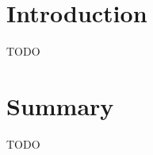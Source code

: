 \label{chap:dsl_implementation}

\section{Introduction}
\label{sec:implementation_intro}

TODO

\section{Summary}
\label{sec:implementation_summary}

TODO

